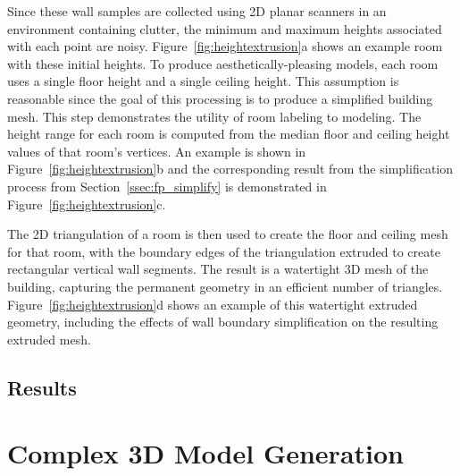 \documentclass[12pt,onecolumn,oneside]{book}
\begin{document}
Since these wall samples are collected using 2D planar scanners in an environment containing clutter, the minimum and maximum heights associated with each point are noisy.  Figure~\ref{fig:heightextrusion}a shows an example room with these initial heights.  To produce aesthetically-pleasing models, each room uses a single floor height and a single ceiling height.  This assumption is reasonable since the goal of this processing is to produce a simplified building mesh.  This step demonstrates the utility of room labeling to modeling.  The height range for each room is computed from the median floor and ceiling height values of that room's vertices.  An example is shown in Figure~\ref{fig:heightextrusion}b and the corresponding result from the simplification process from Section~\ref{ssec:fp_simplify} is demonstrated in Figure~\ref{fig:heightextrusion}c.

The 2D triangulation of a room is then used to create the floor and ceiling mesh for that room, with the boundary edges of the triangulation extruded to create rectangular vertical wall segments.  The result is a watertight 3D mesh of the building, capturing the permanent geometry in an efficient number of triangles.  Figure~\ref{fig:heightextrusion}d shows an example of this watertight extruded geometry, including the effects of wall boundary simplification on the resulting extruded mesh.

\section{Results}
\label{sec:fp_results}



\chapter{Complex 3D Model Generation}
\label{ch:carving}


\end{document}
